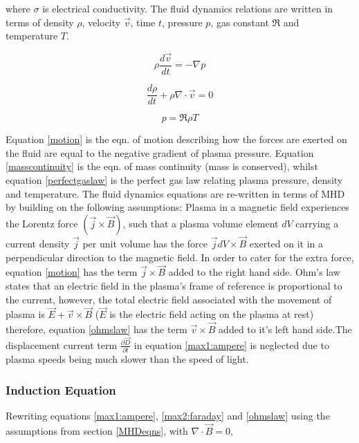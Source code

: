 where $\sigma$ is electrical conductivity. The fluid dynamics relations are written in terms of density $\rho$, velocity $\vec{v}$, time $t$, pressure $p$, gas constant $\Re$ and temperature $T$. 

\begin{equation}\label{motion}
\rho\frac{d\vec{v}}{dt}=-\nabla p
\end{equation}
 
\begin{equation}\label{masscontinuity}
\frac{d\rho}{dt}+\rho\nabla\cdot\vec{v}=0
\end{equation}

\begin{equation}\label{perfectgaslaw}
p=\Re\rho T
\end{equation}

Equation \ref{motion} is the eqn. of motion describing how the forces are exerted on the fluid are equal to the negative gradient of plasma pressure. Equation \ref{masscontinuity} is the eqn. of mass continuity (mass is conserved), whilst equation \ref{perfectgaslaw} is the perfect gas law relating plasma pressure, density and temperature. The fluid dynamics equations are re-written in terms of MHD by building on the following assumptions: Plasma in a magnetic field experiences the Lorentz force $(\vec{j}\times\vec{B})$, such that a plasma volume element $dV$ carrying a current density $\vec{j}$ per unit volume has the force $\vec{j}dV\times\vec{B}$ exerted on it in a perpendicular direction to the magnetic field. In order to cater for the extra force, equation \ref{motion} has the term $\vec{j}\times\vec{B}$ added to the right hand side.   
Ohm's law states that an electric field in the plasma's frame of reference is proportional to the current, however, the total electric field associated with the movement of plasma is $\vec{E}+\vec{v}\times\vec{B}$ ($\vec{E}$ is the electric field acting on the plasma at rest) therefore, equation \ref{ohmslaw} has the term $\vec{v}\times\vec{B}$ added to it's left hand side.The displacement current term $\frac{\partial \vec{D}}{\partial t}$ in equation \ref{max1:ampere} is neglected due to plasma speeds being much slower than the speed of light.

\subsubsection{Induction Equation}\label{inductioneqn}  
Rewriting equations \ref{max1:ampere}, \ref{max2:faraday} and \ref{ohmslaw} using the assumptions from section \ref{MHDeqns}, with $\nabla\cdot\vec{B} = 0$,

